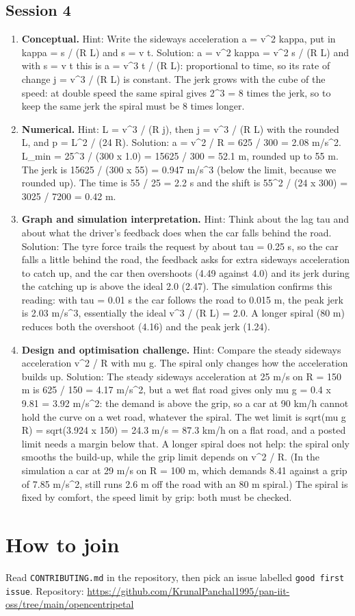\documentclass[11pt,a4paper]{article}
\begin{document}
\subsection*{Session 4}
\begin{enumerate}[nosep]
\item \textbf{Conceptual.} Hint: Write the sideways acceleration a = v\textasciicircum{}2 kappa, put in kappa = s / (R L) and s = v t. Solution: a = v\textasciicircum{}2 kappa = v\textasciicircum{}2 s / (R L) and with s = v t this is a = v\textasciicircum{}3 t / (R L): proportional to time, so its rate of change j = v\textasciicircum{}3 / (R L) is constant. The jerk grows with the cube of the speed: at double speed the same spiral gives 2\textasciicircum{}3 = 8 times the jerk, so to keep the same jerk the spiral must be 8 times longer.
\item \textbf{Numerical.} Hint: L = v\textasciicircum{}3 / (R j), then j = v\textasciicircum{}3 / (R L) with the rounded L, and p = L\textasciicircum{}2 / (24 R). Solution: a = v\textasciicircum{}2 / R = 625 / 300 = 2.08 m/s\textasciicircum{}2. L\_min = 25\textasciicircum{}3 / (300 x 1.0) = 15625 / 300 = 52.1 m, rounded up to 55 m. The jerk is 15625 / (300 x 55) = 0.947 m/s\textasciicircum{}3 (below the limit, because we rounded up). The time is 55 / 25 = 2.2 s and the shift is 55\textasciicircum{}2 / (24 x 300) = 3025 / 7200 = 0.42 m.
\item \textbf{Graph and simulation interpretation.} Hint: Think about the lag tau and about what the driver's feedback does when the car falls behind the road. Solution: The tyre force trails the request by about tau = 0.25 s, so the car falls a little behind the road, the feedback asks for extra sideways acceleration to catch up, and the car then overshoots (4.49 against 4.0) and its jerk during the catching up is above the ideal 2.0 (2.47). The simulation confirms this reading: with tau = 0.01 s the car follows the road to 0.015 m, the peak jerk is 2.03 m/s\textasciicircum{}3, essentially the ideal v\textasciicircum{}3 / (R L) = 2.0. A longer spiral (80 m) reduces both the overshoot (4.16) and the peak jerk (1.24).
\item \textbf{Design and optimisation challenge.} Hint: Compare the steady sideways acceleration v\textasciicircum{}2 / R with mu g. The spiral only changes how the acceleration builds up. Solution: The steady sideways acceleration at 25 m/s on R = 150 m is 625 / 150 = 4.17 m/s\textasciicircum{}2, but a wet flat road gives only mu g = 0.4 x 9.81 = 3.92 m/s\textasciicircum{}2: the demand is above the grip, so a car at 90 km/h cannot hold the curve on a wet road, whatever the spiral. The wet limit is sqrt(mu g R) = sqrt(3.924 x 150) = 24.3 m/s = 87.3 km/h on a flat road, and a posted limit needs a margin below that. A longer spiral does not help: the spiral only smooths the build-up, while the grip limit depends on v\textasciicircum{}2 / R. (In the simulation a car at 29 m/s on R = 100 m, which demands 8.41 against a grip of 7.85 m/s\textasciicircum{}2, still runs 2.6 m off the road with an 80 m spiral.) The spiral is fixed by comfort, the speed limit by grip: both must be checked.
\end{enumerate}

\section{How to join}
Read \texttt{CONTRIBUTING.md} in the repository, then pick an issue labelled \texttt{good first issue}. Repository: \url{https://github.com/KrunalPanchal1995/pan-iit-oss/tree/main/opencentripetal}
\end{document}
